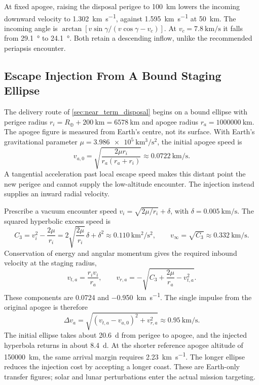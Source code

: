 \documentclass{article}
\newcommand{\deltav}{\Delta v}
\begin{document}
At fixed apogee, raising the disposal perigee to \SI{100}{\kilo\meter} lowers the incoming downward velocity to \SI{1.302}{\kilo\meter\per\second}, against \SI{1.595}{\kilo\meter\per\second} at \SI{50}{\kilo\meter}. The incoming angle is $\arctan[v\sin\gamma/(v\cos\gamma-v_c)]$. At $v_c = \SI{7.8}{\kilo\meter\per\second}$ it falls from \SI{29.1}{\degree} to \SI{24.1}{\degree}. Both retain a descending inflow, unlike the recommended periapsis encounter.

\subsection{Escape Injection From A Bound Staging Ellipse}\label{sec:staging_escape_geometry}
The delivery route of \autoref{sec:near_term_disposal} begins on a bound ellipse with perigee radius $r_i = R_\oplus + \SI{200}{\kilo\meter} = \SI{6578}{\kilo\meter}$ and apogee radius $r_a = \SI{1000000}{\kilo\meter}$. The apogee figure is measured from Earth's centre, not its surface. With Earth's gravitational parameter $\mu = \SI{3.986e5}{\kilo\meter\cubed\per\second\squared}$, the initial apogee speed is
\begin{equation}
v_{a,0} = \sqrt{\frac{2\mu r_i}{r_a(r_a+r_i)}} \approx \SI{0.0722}{\kilo\meter\per\second}.
\end{equation}
A tangential acceleration past local escape speed makes this distant point the new perigee and cannot supply the low-altitude encounter. The injection instead supplies an inward radial velocity.

Prescribe a vacuum encounter speed $v_i = \sqrt{2\mu/r_i} + \delta$, with $\delta = \SI{0.005}{\kilo\meter\per\second}$. The squared hyperbolic excess speed is
\begin{equation}
C_3 = v_i^2 - \frac{2\mu}{r_i}
= 2\sqrt{\frac{2\mu}{r_i}}\,\delta + \delta^2
\approx \SI{0.110}{\kilo\meter\squared\per\second\squared},
\qquad v_\infty = \sqrt{C_3} \approx \SI{0.332}{\kilo\meter\per\second}.
\end{equation}
Conservation of energy and angular momentum gives the required inbound velocity at the staging radius,
\begin{equation}
v_{t,a} = \frac{r_i v_i}{r_a}, \qquad
v_{r,a} = -\sqrt{C_3 + \frac{2\mu}{r_a} - v_{t,a}^2}.
\end{equation}
These components are \SI{0.0724}{} and \SI{-0.950}{\kilo\meter\per\second}. The single impulse from the original apogee is therefore
\begin{equation}
\deltav_a = \sqrt{(v_{t,a}-v_{a,0})^2 + v_{r,a}^2}
\approx \SI{0.95}{\kilo\meter\per\second}.
\end{equation}
The initial ellipse takes about \SI{20.6}{\day} from perigee to apogee, and the injected hyperbola returns in about \SI{8.4}{\day}. At the shorter reference apogee altitude of \SI{150000}{\kilo\meter}, the same arrival margin requires \SI{2.23}{\kilo\meter\per\second}. The longer ellipse reduces the injection cost by accepting a longer coast. These are Earth-only transfer figures; solar and lunar perturbations enter the actual mission targeting.
\end{document}
